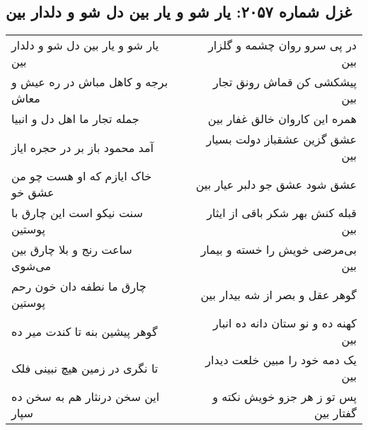 \begin{center}
\section*{غزل شماره ۲۰۵۷: یار شو و یار بین دل شو و دلدار بین}
\label{sec:2057}
\begin{longtable}{l p{0.5cm} r}
یار شو و یار بین دل شو و دلدار بین
&&
در پی سرو روان چشمه و گلزار بین
\\
برجه و کاهل مباش در ره عیش و معاش
&&
پیشکشی کن قماش رونق تجار بین
\\
جمله تجار ما اهل دل و انبیا
&&
همره این کاروان خالق غفار بین
\\
آمد محمود باز بر در حجره ایاز
&&
عشق گزین عشقباز دولت بسیار بین
\\
خاک ایازم که او هست چو من عشق خو
&&
عشق شود عشق جو دلبر عیار بین
\\
سنت نیکو است این چارق با پوستین
&&
قبله کنش بهر شکر باقی از ایثار بین
\\
ساعت رنج و بلا چارق بین می‌شوی
&&
بی‌مرضی خویش را خسته و بیمار بین
\\
چارق ما نطفه دان خون رحم پوستین
&&
گوهر عقل و بصر از شه بیدار بین
\\
گوهر پیشین بنه تا کندت میر ده
&&
کهنه ده و نو ستان دانه ده انبار بین
\\
تا نگری در زمین هیچ نبینی فلک
&&
یک دمه خود را مبین خلعت دیدار بین
\\
این سخن درنثار هم به سخن ده سپار
&&
پس تو ز هر جزو خویش نکته و گفتار بین
\\
\end{longtable}
\end{center}
